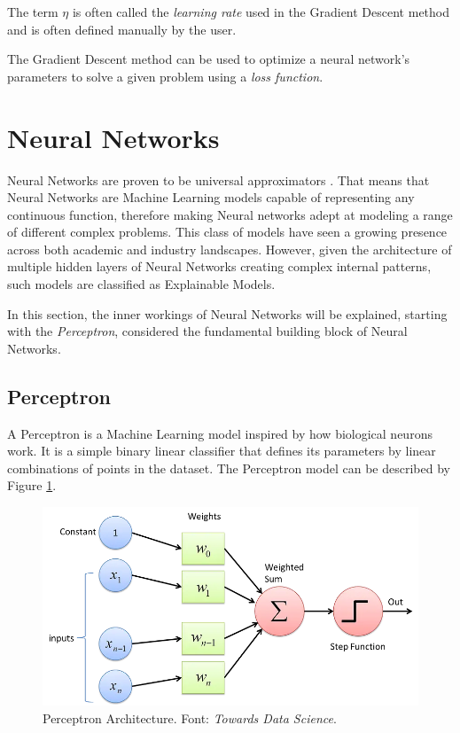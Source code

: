 The term \(\eta\) is often called the \emph{learning rate} used in the Gradient Descent method and is often defined manually by the user.

The Gradient Descent method can be used to optimize a neural network's parameters to solve a given problem using a \emph{loss function}. 

\section{Neural Networks}

Neural Networks are proven to be universal approximators \citep{HORNIK1989359}. That means that Neural Networks are Machine Learning models capable of representing any continuous function,
therefore making Neural networks adept at modeling a range of different complex problems.
This class of models have seen a growing presence across both academic and industry landscapes. However, given the architecture of multiple hidden layers of Neural Networks creating complex internal patterns, such models are classified as Explainable Models. 

In this section, the inner workings of Neural Networks will be explained, starting with the \emph{Perceptron}, considered the fundamental building block of Neural Networks.

\subsection{Perceptron}

A Perceptron is a Machine Learning model inspired by how biological neurons work. 
It is a simple binary linear classifier that defines its parameters by linear combinations of points in the dataset.
The Perceptron model can be described by Figure \ref{fig:perceptron}. 

\newpage
\begin{figure}
    \centering
    \includegraphics[scale=0.4]{figuras/perceptron.png}
    \caption{Perceptron Architecture. Font: \emph{Towards Data Science\footnotemark}. \label{fig:perceptron}}
\end{figure}

